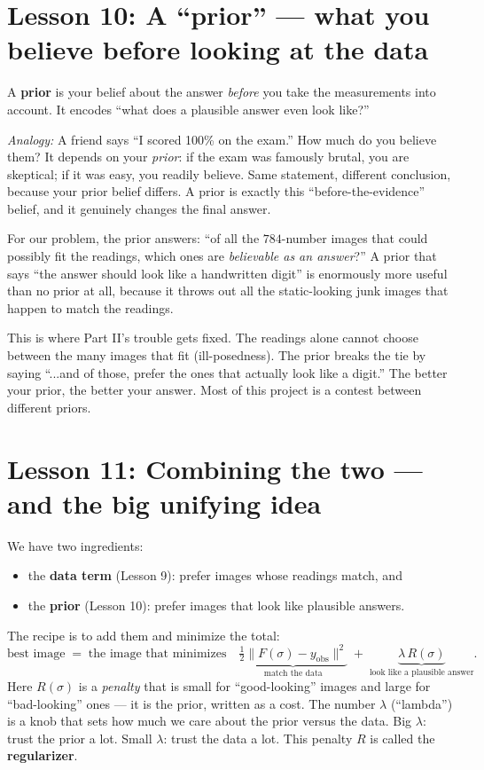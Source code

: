 \documentclass[11pt]{article}
\newcommand{\norm}[1]{\lVert #1 \rVert}
\newcommand{\analogy}[1]{\par\smallskip\noindent\textit{Analogy:} #1\par\smallskip}
\begin{document}
\section{Lesson 10: A ``prior'' --- what you believe before looking at the data}

A \textbf{prior} is your belief about the answer \emph{before} you take the
measurements into account. It encodes ``what does a plausible answer even look
like?''

\analogy{A friend says ``I scored 100\% on the exam.'' How much do you believe
them? It depends on your \emph{prior}: if the exam was famously brutal, you are
skeptical; if it was easy, you readily believe. Same statement, different
conclusion, because your prior belief differs. A prior is exactly this
``before-the-evidence'' belief, and it genuinely changes the final answer.}

For our problem, the prior answers: ``of all the $784$-number images that
could possibly fit the readings, which ones are \emph{believable as an
answer}?'' A prior that says ``the answer should look like a handwritten
digit'' is enormously more useful than no prior at all, because it throws out
all the static-looking junk images that happen to match the readings.

\begin{intuition}
This is where Part II's trouble gets fixed. The readings alone cannot choose
between the many images that fit (ill-posedness). The prior breaks the tie by
saying ``...and of those, prefer the ones that actually look like a digit.''
The better your prior, the better your answer. Most of this project is a
contest between different priors.
\end{intuition}

\section{Lesson 11: Combining the two --- and the big unifying idea}

We have two ingredients:
\begin{itemize}[leftmargin=2em]
\item the \textbf{data term} (Lesson 9): prefer images whose readings match,
and
\item the \textbf{prior} (Lesson 10): prefer images that look like plausible
answers.
\end{itemize}
The recipe is to add them and minimize the total:
\[
\text{best image} \;=\; \text{the image that minimizes}\quad
\underbrace{\tfrac12\norm{F(\sigma)-y_{\text{obs}}}^2}_{\text{match the data}}
\;+\;
\underbrace{\lambda\, R(\sigma)}_{\text{look like a plausible answer}} .
\]
Here $R(\sigma)$ is a \emph{penalty} that is small for ``good-looking'' images
and large for ``bad-looking'' ones --- it is the prior, written as a cost. The
number $\lambda$ (``lambda'') is a knob that sets how much we care about the
prior versus the data. Big $\lambda$: trust the prior a lot. Small $\lambda$:
trust the data a lot. This penalty $R$ is called the \textbf{regularizer}.
\end{document}
